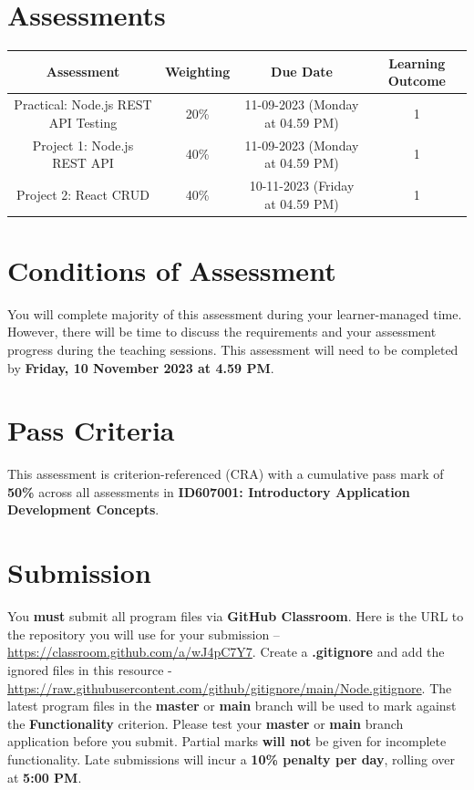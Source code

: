 \documentclass{article}
\begin{document}
\section*{Assessments}
\renewcommand{\arraystretch}{1.5}
\begin{tabular}{|c|c|c|c|}
	\hline
	\textbf{Assessment}                                 & \textbf{Weighting} & \textbf{Due Date}            & \textbf{Learning Outcome} \\ \hline
	\small Practical: Node.js REST API Testing & \small 20\%        & \small 11-09-2023 (Monday at 04.59 PM)   & \small 1                   \\ \hline
	\small Project 1: Node.js REST API                  & \small 40\%        & \small \small 11-09-2023 (Monday at 04.59 PM) & \small 1                   \\ \hline
	\small Project 2: React CRUD                        & \small 40\%        & \small 10-11-2023 (Friday at 04.59 PM)  & \small 1                   \\ \hline
\end{tabular}

\section*{Conditions of Assessment}
You will complete majority of this assessment during your learner-managed time. However, there will be time to discuss the requirements and your assessment progress during the teaching sessions. This assessment will need to be completed by \textbf{Friday, 10 November 2023 at 4.59 PM}.

\section*{Pass Criteria}
This assessment is criterion-referenced (CRA) with a cumulative pass mark of \textbf{50\%} across all assessments in \textbf{ID607001: Introductory Application Development Concepts}.

\section*{Submission}
You \textbf{must} submit all program files via \textbf{GitHub Classroom}. Here is the URL to the repository you will use for your submission – \href{https://classroom.github.com/a/wJ4pC7Y7}{https://classroom.github.com/a/wJ4pC7Y7}. Create a \textbf{.gitignore} and add the ignored files in this resource - \href{https://raw.githubusercontent.com/github/gitignore/main/Node.gitignore}{https://raw.githubusercontent.com/github/gitignore/main/Node.gitignore}. The latest program files in the \textbf{master} or \textbf{main} branch will be used to mark against the \textbf{Functionality} criterion. Please test your \textbf{master} or \textbf{main} branch application before you submit. Partial marks \textbf{will not} be given for incomplete functionality. Late submissions will incur a \textbf{10\% penalty per day}, rolling over at \textbf{5:00 PM}.
\end{document}
